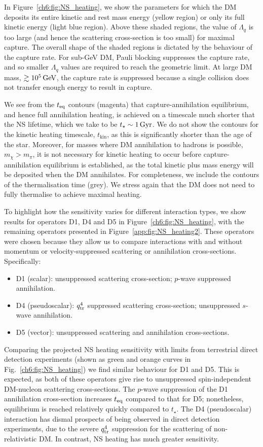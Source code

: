 In Figure~\ref{ch6:fig:NS_heating}, we show the parameters for which the DM deposits its entire kinetic and rest mass energy (yellow region) or only its full kinetic energy (light blue region).  Above these shaded regions, the value of $\Lambda_q$ is too large (and hence the scattering cross-section is too small) for maximal capture.
The overall shape of the shaded regions is dictated by the behaviour of the capture rate. For sub-GeV DM, Pauli blocking suppresses the capture rate, and so smaller $\Lambda_q$ values are required to reach the geometric limit. At large DM mass, $\gtrsim 10^5{\rm \,GeV}$, the capture rate is suppressed because a single collision does not transfer enough energy to result in capture.


We see from the $t_{\rm eq}$ contours (magenta) that capture-annihilation equilibrium, and hence full annihilation heating, is achieved on a timescale much shorter that the NS lifetime, which we take to be $t_\star\sim 1{\rm \,Gyr}$. 
We do not show the contours for the kinetic heating timescale, $t_\mathrm{kin}$, as this is significantly shorter than the age of the star.  Moreover, for masses where DM annihilation to hadrons is possible, $m_\chi>m_\pi$, it is not necessary for kinetic heating to occur before capture-annihilation equilibrium is established, as the total kinetic plus mass energy will be deposited when the DM annihilates. 
For completeness, we include the contours of the thermalisation time (grey). We stress again that the DM does not need to fully thermalise to achieve maximal heating.


To highlight how the sensitivity varies for different interaction types, we show results for operators D1, D4 and D5 in Figure~\ref{ch6:fig:NS_heating}, with the remaining operators presented in Figure~\ref{app:fig:NS_heating2}. These operators were chosen because they allow us to compare interactions with and without momentum or velocity-suppressed scattering or annihilation cross-sections. Specifically: 
\begin{itemize}
\item D1 (scalar): unsuppressed scattering cross-section; $p$-wave suppressed annihilation.
\item D4 (pseudoscalar): $q_{\rm tr}^4$ suppressed scattering cross-section; unsuppressed $s$-wave annihilation.
\item D5 (vector): unsuppressed scattering and annihilation cross-sections.
\end{itemize}

Comparing the projected NS heating sensitivity with limits from terrestrial direct detection experiments (shown as green and orange curves in Fig.~\ref{ch6:fig:NS_heating}) we find similar behaviour for D1 and D5. This is expected, as both of these operators give rise to unsuppressed spin-independent DM-nucleon scattering cross-sections. The $p$-wave suppression of the D1 annihilation cross-section increases $t_{\rm eq}$ compared to that for D5; nonetheless, equilibrium is reached relatively quickly compared to $t_\star$.  The D4 (pseudoscalar) interaction has dismal prospects of being observed in direct detection experiments, due to the severe  $q_{\rm tr}^4$ suppression for the scattering of non-relativistic DM. In contrast, NS heating has much greater sensitivity.

